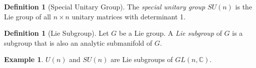 \documentclass{book}
\theoremstyle{definition}
\newtheorem{df}[prop]{Definition}
\newtheorem{ex}[prop]{Example}
\begin{document}
\begin{df}[Special Unitary Group]
The \emph{special unitary group} $SU(n)$ is the Lie group of all $n \times n$ unitary matrices with determinant 1.
\end{df}

\begin{df}[Lie Subgroup]
Let $G$ be a Lie group. A \emph{Lie subgroup} of $G$ is a subgroup that is also an analytic submanifold of $G$.
\end{df}

\begin{ex}
$U(n)$ and $SU(n)$ are Lie subgroups of $GL(n, \mathbb{C})$.
\end{ex}
\end{document}
